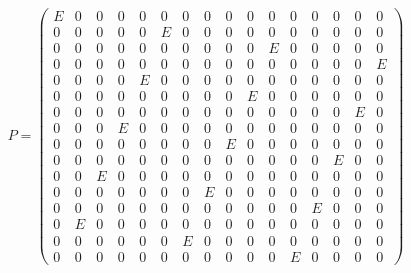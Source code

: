 \documentclass[11pt,a4paper]{article}
\begin{document}
\begin{eqnarray*}
  P = \left(\begin{array}{rrrrrrrrrrrrrrrr}
    E & 0 & 0 & 0 & 0 & 0 & 0 & 0 & 0 & 0 & 0 & 0 & 0 & 0 & 0 & 0 \\
    0 & 0 & 0 & 0 & 0 & E & 0 & 0 & 0 & 0 & 0 & 0 & 0 & 0 & 0 & 0 \\
    0 & 0 & 0 & 0 & 0 & 0 & 0 & 0 & 0 & 0 & E & 0 & 0 & 0 & 0 & 0 \\
    0 & 0 & 0 & 0 & 0 & 0 & 0 & 0 & 0 & 0 & 0 & 0 & 0 & 0 & 0 & E \\
     0 & 0 & 0 & 0 & E & 0 & 0 & 0 & 0 & 0 & 0 & 0 & 0 & 0 & 0 & 0 \\
    0 & 0 & 0 & 0 & 0 & 0 & 0 & 0 & 0 & E & 0 & 0 & 0 & 0 & 0 & 0 \\
    0 & 0 & 0 & 0 & 0 & 0 & 0 & 0 & 0 & 0 & 0 & 0 & 0 & 0 & E & 0 \\
    0 & 0 & 0 & E & 0 & 0 & 0 & 0 & 0 & 0 & 0 & 0 & 0 & 0 & 0 & 0 \\
     0 & 0 & 0 & 0 & 0 & 0 & 0 & 0 & E & 0 & 0 & 0 & 0 & 0 & 0 & 0 \\
    0 & 0 & 0 & 0 & 0 & 0 & 0 & 0 & 0 & 0 & 0 & 0 & 0 & E & 0 & 0 \\
    0 & 0 & E & 0 & 0 & 0 & 0 & 0 & 0 & 0 & 0 & 0 & 0 & 0 & 0 & 0 \\
    0 & 0 & 0 & 0 & 0 & 0 & 0 & E & 0 & 0 & 0 & 0 & 0 & 0 & 0 & 0 \\
     0 & 0 & 0 & 0 & 0 & 0 & 0 & 0 & 0 & 0 & 0 & 0 & E & 0 & 0 & 0 \\
    0 & E & 0 & 0 & 0 & 0 & 0 & 0 & 0 & 0 & 0 & 0 & 0 & 0 & 0 & 0 \\
    0 & 0 & 0 & 0 & 0 & 0 & E & 0 & 0 & 0 & 0 & 0 & 0 & 0 & 0 & 0 \\
    0 & 0 & 0 & 0 & 0 & 0 & 0 & 0 & 0 & 0 & 0 & E & 0 & 0 & 0 & 0
    \end{array}\right)
\end{eqnarray*}
\end{document}
